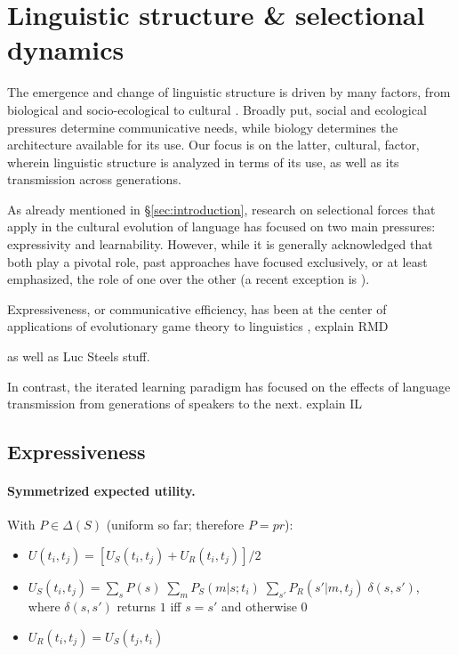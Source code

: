 \documentclass[a4paper]{article}
\newcommand{\hl}[1]{\textcolor[rgb]{.8,.33,.0}{#1}}%
\begin{document}
\section{Linguistic structure \& selectional dynamics}
The emergence and change of linguistic structure is driven by many factors, from biological and socio-ecological to cultural \citep{steels:2011,tamariz+kirby:2016}. Broadly put, social and ecological pressures determine communicative needs, while biology determines the architecture available for its use. Our focus is on the latter, cultural, factor, wherein linguistic structure is analyzed in terms of its use, as well as its transmission across generations. 

As already mentioned in \S\ref{sec:introduction}, research on selectional forces that apply in the cultural evolution of language has focused on two main pressures: expressivity and learnability. However, while it is generally acknowledged that both play a pivotal role, past approaches have focused exclusively, or at least emphasized, the role of one over the other (a recent exception is \citealt{kirby+etal:2015}). 

Expressiveness, or communicative efficiency, has been at the center of applications of evolutionary game theory to linguistics \citep{nowak+krakauer:1999,huttegger+zollman:2013},  \hl{explain RMD}

as well as \hl{Luc Steels stuff}.

In contrast, the iterated learning paradigm has focused on the effects of language transmission from generations of speakers to the next. \hl{explain IL}




\subsection{Expressiveness}

\paragraph{Symmetrized expected utility.} With $P \in \Delta(S)$ (uniform so far; therefore $P = pr$):
\begin{itemize}

  \item $U(t_i,t_j) = [U_S(t_i,t_j) + U_R(t_i,t_j)] / 2$
  \item $U_S(t_i,t_j) = \sum_s P(s) \; \sum_m P_S(m|s;t_i) \; \sum_{s'} P_R(s'|m,t_j) \; \delta(s,s')$, where $\delta(s,s')$ returns $1$ iff $s = s'$ and otherwise $0$
  \item $U_R(t_i,t_j) = U_S(t_j,t_i)$
\end{itemize}
\end{document}

